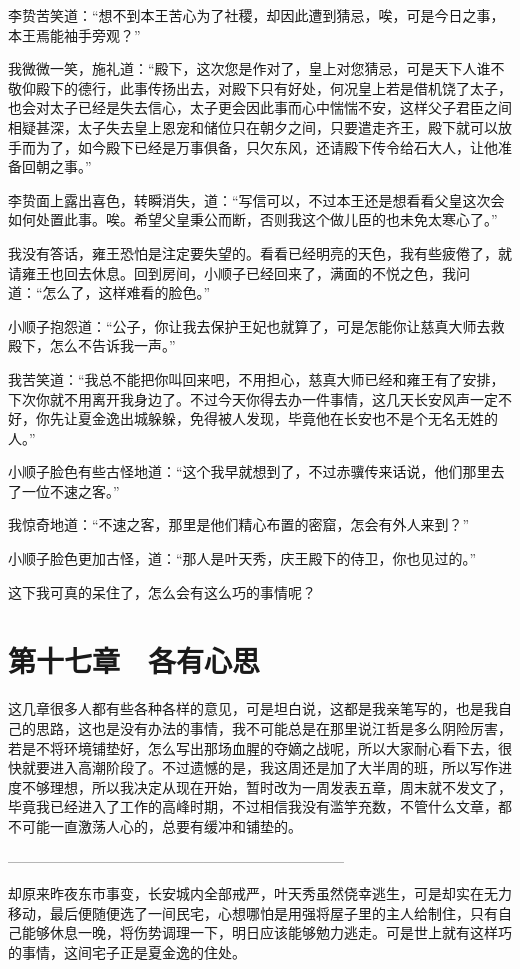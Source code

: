 李贽苦笑道：“想不到本王苦心为了社稷，却因此遭到猜忌，唉，可是今日之事，本王焉能袖手旁观？”

我微微一笑，施礼道：“殿下，这次您是作对了，皇上对您猜忌，可是天下人谁不敬仰殿下的德行，此事传扬出去，对殿下只有好处，何况皇上若是借机饶了太子，也会对太子已经是失去信心，太子更会因此事而心中惴惴不安，这样父子君臣之间相疑甚深，太子失去皇上恩宠和储位只在朝夕之间，只要遣走齐王，殿下就可以放手而为了，如今殿下已经是万事俱备，只欠东风，还请殿下传令给石大人，让他准备回朝之事。”

李贽面上露出喜色，转瞬消失，道：“写信可以，不过本王还是想看看父皇这次会如何处置此事。唉。希望父皇秉公而断，否则我这个做儿臣的也未免太寒心了。”

我没有答话，雍王恐怕是注定要失望的。看看已经明亮的天色，我有些疲倦了，就请雍王也回去休息。回到房间，小顺子已经回来了，满面的不悦之色，我问道：“怎么了，这样难看的脸色。”

小顺子抱怨道：“公子，你让我去保护王妃也就算了，可是怎能你让慈真大师去救殿下，怎么不告诉我一声。”

我苦笑道：“我总不能把你叫回来吧，不用担心，慈真大师已经和雍王有了安排，下次你就不用离开我身边了。不过今天你得去办一件事情，这几天长安风声一定不好，你先让夏金逸出城躲躲，免得被人发现，毕竟他在长安也不是个无名无姓的人。”

小顺子脸色有些古怪地道：“这个我早就想到了，不过赤骥传来话说，他们那里去了一位不速之客。”

我惊奇地道：“不速之客，那里是他们精心布置的密窟，怎会有外人来到？”

小顺子脸色更加古怪，道：“那人是叶天秀，庆王殿下的侍卫，你也见过的。”

这下我可真的呆住了，怎么会有这么巧的事情呢？

\chapter{第十七章　各有心思}

这几章很多人都有些各种各样的意见，可是坦白说，这都是我亲笔写的，也是我自己的思路，这也是没有办法的事情，我不可能总是在那里说江哲是多么阴险厉害，若是不将环境铺垫好，怎么写出那场血腥的夺嫡之战呢，所以大家耐心看下去，很快就要进入高潮阶段了。不过遗憾的是，我这周还是加了大半周的班，所以写作进度不够理想，所以我决定从现在开始，暂时改为一周发表五章，周末就不发文了，毕竟我已经进入了工作的高峰时期，不过相信我没有滥竽充数，不管什么文章，都不可能一直激荡人心的，总要有缓冲和铺垫的。

————————————————————————

却原来昨夜东市事变，长安城内全部戒严，叶天秀虽然侥幸逃生，可是却实在无力移动，最后便随便选了一间民宅，心想哪怕是用强将屋子里的主人给制住，只有自己能够休息一晚，将伤势调理一下，明日应该能够勉力逃走。可是世上就有这样巧的事情，这间宅子正是夏金逸的住处。

